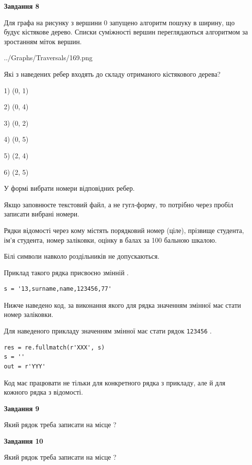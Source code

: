 \documentclass[12pt, ukrainian]{article}
\def\code#1{\Verb!#1!}
\begin{document}
{\begin {large}
{\begin {center}\textbf{Завдання 8}\end {center}}\par
Для графа на рисунку з вершини 0 запущено алгоритм пошуку в ширину, що будує кістякове дерево. Списки суміжності вершин переглядаються алгоритмом за зростанням міток вершин.\par
\begin{center}
	{../Graphs/Traversals/169.png}
\end{center}
\par Які з наведених ребер входять до складу отриманого кістякового дерева?\par
1) (0, 1)\par
2) (0, 4)\par
3) (0, 2)\par
4) (0, 5)\par
5) (2, 4)\par
6) (2, 5)\par
{\vskip 15pt} У формі вибрати номери відповідних ребер.


Якщо заповнюєте текстовий файл, а не гугл-форму, то потрібно через пробіл записа\-ти вибрані номери.\par
\newpage


Рядки відомості через кому містять порядковий номер (ціле), пріз\-ви\-ще студен\-та, ім'я студента, номер заліковки, оцінку в балах за 100 бальною шкалою.

Білі символи навколо роздільників не допускаються.

Приклад такого рядка присвоєно змінній .



\begin{verbatim}
s = '13,surname,name,123456,77'
\end{verbatim}


Нижче наведено код, за виконання якого для рядка  значенням змінної  має стати номер заліковки.

Для наведеного прикладу значенням змінної  має стати рядок \code{123456} .



\begin{verbatim}
res = re.fullmatch(r'XXX', s)
s = ''
out = r'YYY'
\end{verbatim}


Код має працювати не тільки для конкретного рядка з прикладу, але й для кожного рядка з відомості.

{\begin {center}\textbf{Завдання 9}\end {center}}\par
Який рядок треба записати на місце  ?\par
\vspace{5mm}


{\begin {center}\textbf{Завдання 10}\end {center}}\par
Який рядок треба записати на місце  ?\par


\newpage


\end {large}}
\end{document}
